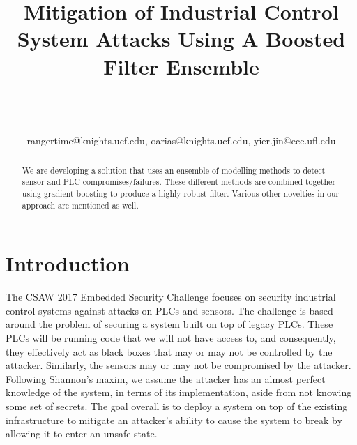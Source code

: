 \documentclass[10pt,twocolumn]{IEEEtran}
\begin{document}
\title{Mitigation of Industrial Control System Attacks Using A Boosted Filter Ensemble}

\author{\\
\\
\\
{rangertime@knights.ucf.edu, oarias@knights.ucf.edu, yier.jin@ece.ufl.edu}\vspace{-0.16in}\vspace{-0.2in}}

\maketitle
\pagestyle{empty}
\thispagestyle{empty}

\begin{abstract}
We are developing a solution that uses an ensemble of modelling methods to detect sensor and PLC compromises/failures.
These different methods are combined together using gradient boosting to produce a highly robust filter.
Various other novelties in our approach are mentioned as well.
\end{abstract}

\section{Introduction}
The CSAW 2017 Embedded Security Challenge focuses on security industrial control systems against attacks on PLCs and sensors.
The challenge is based around the problem of securing a system built on top of legacy PLCs.
These PLCs will be running code that we will not have access to, and consequently, they effectively act as black boxes that may or may not be controlled by the attacker.
Similarly, the sensors may or may not be compromised by the attacker.
Following Shannon's maxim, we assume the attacker has an almost perfect knowledge of the system, in terms of its implementation, aside from not knowing some set of secrets.
The goal overall is to deploy a system on top of the existing infrastructure to mitigate an attacker's ability to cause the system to break by allowing it to enter an unsafe state.
\end{document}
